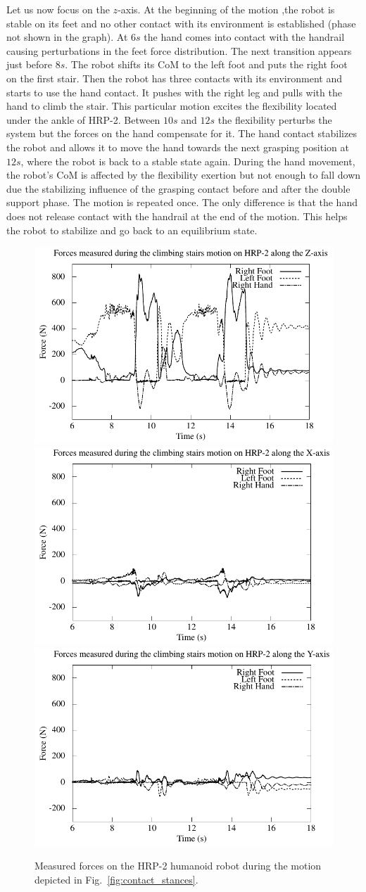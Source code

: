 Let us now focus on the $z$-axis.
At the beginning of the motion ,the robot is stable on its feet and no other contact with its environment is established (phase not shown in the graph).
At $6 s$ the hand comes into contact with the handrail causing perturbations in the feet force distribution.
The next transition appears just before $8 s$.
The robot shifts its CoM to the left foot and puts the right foot on the first stair.
Then the robot has three contacts with its environment and starts to use the hand contact.
It pushes with the right leg and pulls with the hand to climb the stair.
This particular motion excites the flexibility located under the ankle of HRP-2.
Between $10 s$ and $12 s$ the flexibility perturbs the system but the forces on the hand compensate for it.
The hand contact stabilizes the robot and allows it to move the hand towards the next grasping position at $12 s$, where the robot is back to a stable state again.
During the hand movement, the robot's CoM is affected by the flexibility exertion but not enough to fall down due the stabilizing influence of the grasping contact before and after the double support phase.
The motion is repeated once.
The only difference is that the hand does not release contact with the handrail at the end of the motion.
This helps the robot to stabilize and go back to an equilibrium state.
%
\begin{figure}[h]
  \centering
        \includegraphics[width=0.35\linewidth, keepaspectratio]{./figures/gcfz.pdf} \\
        \includegraphics[width=0.35\linewidth, keepaspectratio]{./figures/gcfx.pdf}%
        \includegraphics[width=0.35\linewidth, keepaspectratio]{./figures/gcfy.pdf}%
    \caption{%
        Measured forces on the HRP-2 humanoid robot during the motion depicted in Fig.~\ref{fig:contact_stances}.
        }
\label{fig:measured_contact_forces}
\end{figure}
%

